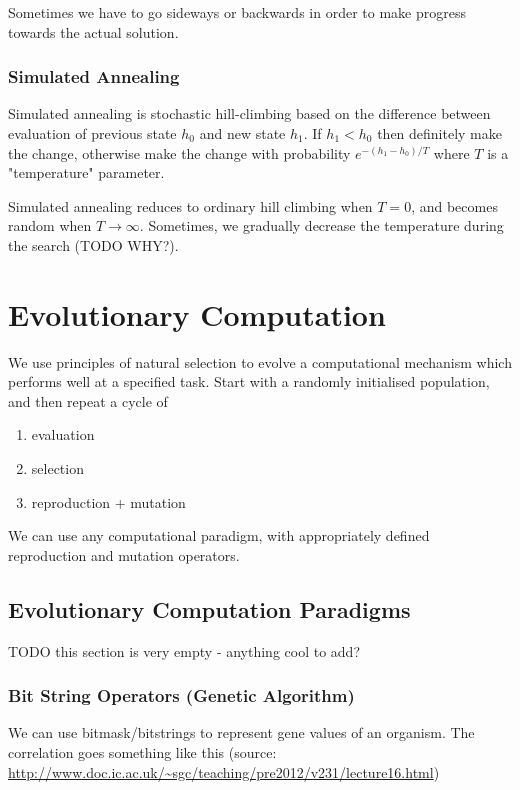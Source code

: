 Sometimes we have to go sideways or backwards in order to make progress towards
the actual solution.

\subsection{Simulated Annealing}
Simulated annealing is stochastic hill-climbing based on the difference between
evaluation of previous state $h_0$ and new state $h_1$. If $h_1 < h_0$ then
definitely make the change, otherwise make the change with probability
$e^{-(h_1-h_0)/T}$ where $T$ is a "temperature" parameter.

Simulated annealing reduces to ordinary hill climbing when $T = 0$, and becomes
random when $T \rightarrow \infty$. Sometimes, we gradually decrease the
temperature during the search (TODO WHY?).

\chapter{Evolutionary Computation}
We use principles of natural selection to evolve a computational mechanism
which performs well at a specified task. Start with a randomly initialised
population, and then repeat a cycle of

\begin{enumerate}
    \item evaluation
    \item selection
    \item reproduction + mutation
\end{enumerate}

We can use any computational paradigm, with appropriately defined reproduction
and mutation operators.

\section{Evolutionary Computation Paradigms}
TODO this section is very empty - anything cool to add?

\subsection{Bit String Operators (Genetic Algorithm)}
We can use bitmask/bitstrings to represent gene values of an organism. The
correlation goes something like this (source:
\url{http://www.doc.ic.ac.uk/~sgc/teaching/pre2012/v231/lecture16.html})

